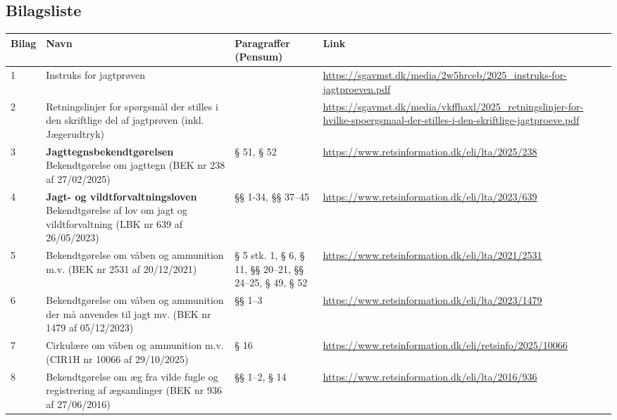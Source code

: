 \documentclass[10pt,a4paper]{article}
\begin{document}
\vspace{1cm}

\subsection*{Bilagsliste}

{\footnotesize
\setlength{\tabcolsep}{3pt}
\renewcommand{\arraystretch}{1.25}

\centering
\begin{tabular}{|P{1.1cm}|P{5.2cm}|P{3.2cm}|P{6.0cm}|}
\hline
\textbf{Bilag} & \textbf{Navn} & \textbf{Paragraffer (Pensum)} & \textbf{Link} \\
\hline

1 & Instruks for jagtprøven & & \url{https://sgavmst.dk/media/2w5hrceb/2025_instruks-for-jagtproeven.pdf} \\
\hline

2 & Retningslinjer for spørgsmål der stilles i den skriftlige del af jagtprøven (inkl. Jægerudtryk) & & \url{https://sgavmst.dk/media/vkffhaxl/2025_retningslinjer-for-hvilke-spoergsmaal-der-stilles-i-den-skriftlige-jagtproeve.pdf} \\
\hline

3 & \textbf{Jagttegnsbekendtgørelsen} Bekendtgørelse om jagttegn (BEK nr 238 af 27/02/2025) & § 51, § 52 & \url{https://www.retsinformation.dk/eli/lta/2025/238} \\
\hline

4 & \textbf{Jagt- og vildtforvaltningsloven} Bekendtgørelse af lov om jagt og vildtforvaltning (LBK nr 639 af 26/05/2023) & §§ 1-34, §§ 37–45 & \url{https://www.retsinformation.dk/eli/lta/2023/639} \\
\hline

5 & Bekendtgørelse om våben og ammunition m.v. (BEK nr 2531 af 20/12/2021) & § 5 stk. 1, § 6, § 11, §§ 20–21, §§ 24–25, § 49, § 52 & \url{https://www.retsinformation.dk/eli/lta/2021/2531} \\
\hline

6 & Bekendtgørelse om våben og ammunition der må anvendes til jagt mv. (BEK nr 1479 af 05/12/2023) & §§ 1–3 & \url{https://www.retsinformation.dk/eli/lta/2023/1479} \\
\hline

7 & Cirkulære om våben og ammunition m.v. (CIR1H nr 10066 af 29/10/2025) & § 16 & \url{https://www.retsinformation.dk/eli/retsinfo/2025/10066} \\
\hline

8 & Bekendtgørelse om æg fra vilde fugle og registrering af ægsamlinger (BEK nr 936 af 27/06/2016) & §§ 1–2, § 14 & \url{https://www.retsinformation.dk/eli/lta/2016/936} \\
\hline


\end{tabular}}
\end{document}
